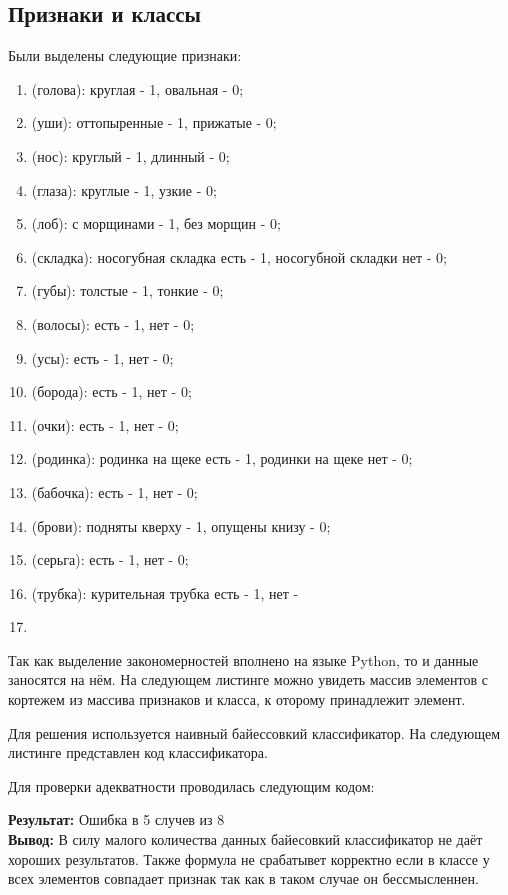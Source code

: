 \documentclass[a4paper, 12pt]{article}
\begin{document}
\subsection{Признаки и классы}
Были выделены следующие признаки:
\begin{enumerate}
  \item (голова): круглая - 1, овальная - 0;
  \item (уши): оттопыренные - 1, прижатые - 0;
  \item (нос): круглый - 1, длинный - 0;
  \item (глаза): круглые - 1, узкие - 0;
  \item (лоб): с морщинами - 1, без морщин - 0;
  \item (складка): носогубная складка есть - 1, носогубной складки нет - 0;
  \item (губы): толстые - 1, тонкие - 0;
  \item (волосы): есть - 1, нет - 0;
  \item (усы): есть - 1, нет - 0;
  \item (борода): есть - 1, нет - 0;
  \item (очки): есть - 1, нет - 0;
  \item (родинка): родинка на щеке есть - 1, родинки на щеке нет - 0;
  \item (бабочка): есть - 1, нет - 0;
  \item (брови): подняты кверху - 1, опущены книзу - 0;
  \item (серьга): есть - 1, нет - 0;
  \item (трубка): курительная трубка есть - 1, нет - \item
\end{enumerate}
Так как выделение закономерностей вполнено на языке Python, то и данные заносятся на нём. На следующем листинге можно увидеть массив элементов с кортежем из массива признаков и класса, к оторому принадлежит элемент.

Для решения используется наивный байессовкий классификатор. На следующем листинге представлен код классификатора.

Для проверки адекватности проводилась следующим кодом:

\textbf{Результат:} Ошибка в 5 случев из 8 \\
\textbf{Вывод:} В силу малого количества данных байесовкий классификатор не даёт хороших результатов. Также формула не срабатывет корректно если в классе у всех элементов совпадает признак так как в таком случае он бессмысленнен.
\newpage
\end{document}
